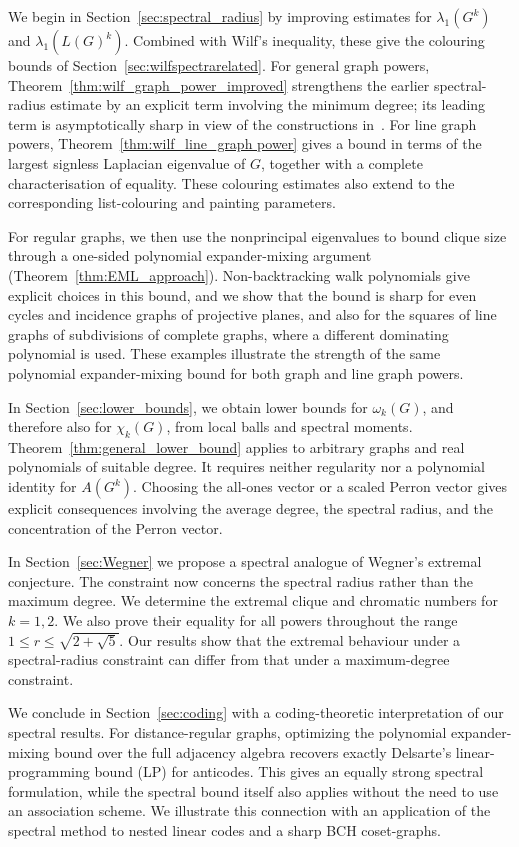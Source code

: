 \documentclass[11pt]{article}
\theoremstyle{plain}
\numberwithin{equation}{section}
\begin{document}
 
We begin in Section~\ref{sec:spectral_radius} by improving estimates for $\lambda_1(G^k)$ and $\lambda_1(L(G)^k)$. Combined with Wilf's inequality, these give the colouring bounds of Section~\ref{sec:wilfspectrarelated}. For general graph powers, Theorem~\ref{thm:wilf_graph_power_improved} strengthens the earlier spectral-radius estimate by an explicit term involving the minimum degree; its leading term is asymptotically sharp in view of the constructions in~\cite{vanBatenburg_Korsky_2026}. For line graph powers, Theorem~\ref{thm:wilf_line_graph power} gives a bound in terms of the largest signless Laplacian eigenvalue of $G$, together with a complete characterisation of equality. These colouring estimates also extend to the corresponding list-colouring and painting parameters.

For regular graphs, we then use the nonprincipal eigenvalues to bound clique size through a one-sided polynomial expander-mixing argument (Theorem~\ref{thm:EML_approach}). Non-backtracking walk polynomials give explicit choices in this bound, and we show that the bound is sharp for even cycles and incidence graphs of projective planes, and also for the squares of line graphs of subdivisions of complete graphs, where a different dominating polynomial is used. These examples illustrate the strength of the same polynomial expander-mixing bound for both graph and line graph powers.

In Section~\ref{sec:lower_bounds}, we obtain lower bounds for $\omega_k(G)$, and therefore also for $\chi_k(G)$, from local balls and spectral moments. Theorem~\ref{thm:general_lower_bound} applies to arbitrary graphs and real polynomials of suitable degree. It requires neither regularity nor a polynomial identity for $A(G^k)$. Choosing the all-ones vector or a scaled Perron vector gives explicit consequences involving the average degree, the spectral radius, and the concentration of the Perron vector.

In Section~\ref{sec:Wegner} we propose a spectral analogue of Wegner's extremal conjecture. The constraint now concerns the spectral radius rather than the maximum degree. We determine the extremal clique and chromatic numbers for $k=1,2$. We also prove their equality for all powers throughout the range $1\leq r\leq\sqrt{2+\sqrt{5}}$. Our results show that the extremal behaviour under a spectral-radius constraint can differ from that under a maximum-degree constraint.

We conclude in Section~\ref{sec:coding} with a coding-theoretic interpretation of our spectral results. For distance-regular graphs, optimizing the polynomial expander-mixing bound over the full adjacency algebra recovers exactly Delsarte's linear-programming bound (LP) for anticodes. This gives an equally strong spectral formulation, while the spectral bound itself also applies without the need to use an association scheme. We illustrate this connection with an application of the spectral method to nested linear codes and a sharp BCH coset-graphs.
\end{document}
